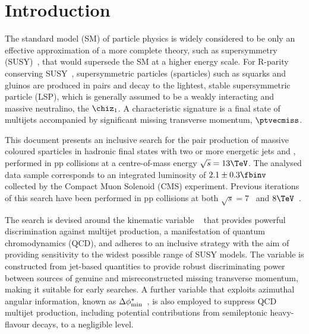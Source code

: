 \section{Introduction}
\label{sec:introduction}

The standard model (SM) of particle physics is widely considered to be
only an effective approximation of a more complete theory, such as
supersymmetry (SUSY)~\cite{ref:SUSY-1,ref:SUSY0,ref:SUSY1,ref:SUSY2,ref:SUSY3,ref:SUSY4,ref:hierarchy1,ref:hierarchy2},
that would supersede the SM at a higher energy scale. For R-parity conserving
SUSY~\cite{Farrar:1978xj}, supersymmetric particles (sparticles) such
as squarks and gluinos are produced in pairs and decay to the
lightest, stable supersymmetric particle (LSP), which is generally
assumed to be a weakly interacting and massive neutralino, the $\chiz_1$. 
A characteristic signature is a final state of multijets accompanied by
significant missing transverse momentum, $\ptvecmiss$.

This document presents an inclusive search for the pair production of
massive coloured sparticles in hadronic final states with two or more
energetic jets and \met, performed in pp collisions at a
centre-of-mass energy $\sqrt{s} = 13\TeV$. The analysed data sample
corresponds to an integrated luminosity of $2.1 \pm 0.3
\fbinv$~\cite{lumi} collected by the Compact Muon Solenoid (CMS)
experiment. Previous iterations of this search have been performed in
pp collisions at both $\sqrt{s} = 7$~\cite{RA1Paper, RA1Paper2011,
  RA1Paper2011FULL} and $8\TeV$~\cite{RA1Paper2012}.

The search is devised around the kinematic variable
\alphat~\cite{Randall:2008rw, RA1Paper} that provides powerful
discrimination against multijet production, a manifestation of quantum
chromodynamics (QCD), and adheres to an inclusive strategy with the
aim of providing sensitivity to the widest possible range of SUSY
models. The \alphat variable is constructed from jet-based quantities
to provide robust discriminating power between sources of genuine and
misreconstructed missing transverse momentum, making it suitable for early
searches. A further variable that exploits azimuthal angular
information, known as $\Delta\phi^{*}_{\rm min}$~\cite{RA1Paper}, is
also employed to suppress QCD multijet production, including potential
contributions from semileptonic heavy-flavour decays, to a negligible
level.

